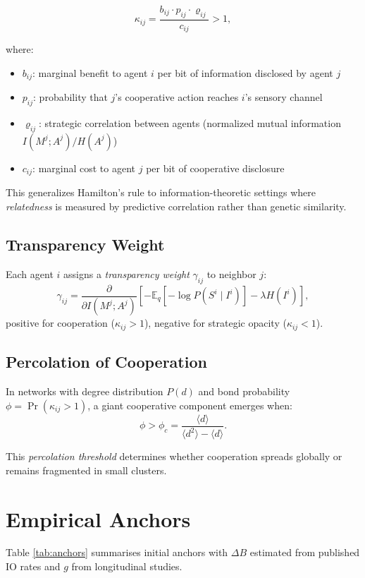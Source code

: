 \documentclass[10pt,conference]{IEEEtran}
\begin{document}
\begin{equation}
\kappa_{ij} = \frac{b_{ij} \cdot p_{ij} \cdot \varrho_{ij}}{c_{ij}} > 1,
\end{equation}

where:
\begin{itemize}
\item $b_{ij}$: marginal benefit to agent $i$ per bit of information disclosed by agent $j$
\item $p_{ij}$: probability that $j$'s cooperative action reaches $i$'s sensory channel
\item $\varrho_{ij}$: strategic correlation between agents (normalized mutual information $I(M^j;A^j)/H(A^j)$)
\item $c_{ij}$: marginal cost to agent $j$ per bit of cooperative disclosure
\end{itemize}

This generalizes Hamilton's rule to information-theoretic settings where \emph{relatedness} is measured by predictive correlation rather than genetic similarity.

\subsection{Transparency Weight}
Each agent $i$ assigns a \emph{transparency weight} $\gamma_{ij}$ to neighbor $j$:
\begin{equation}
\gamma_{ij} = \frac{\partial}{\partial I(M^j;A^j)} \left[-\mathbb{E}_q[-\log P(S^i \mid I^i)] - \lambda H(I^i)\right],
\end{equation}
positive for cooperation ($\kappa_{ij} > 1$), negative for strategic opacity ($\kappa_{ij} < 1$).

\subsection{Percolation of Cooperation}
In networks with degree distribution $P(d)$ and bond probability $\phi = \Pr(\kappa_{ij} > 1)$, a giant cooperative component emerges when:
\begin{equation}
\phi > \phi_c = \frac{\langle d \rangle}{\langle d^2 \rangle - \langle d \rangle}.
\end{equation}

This \emph{percolation threshold} determines whether cooperation spreads globally or remains fragmented in small clusters.

\section{Empirical Anchors}
\label{sec:anchors}
Table \ref{tab:anchors} summarises initial anchors with \(\Delta B\) estimated from published IO rates and \(g\) from longitudinal studies.
\end{document}
